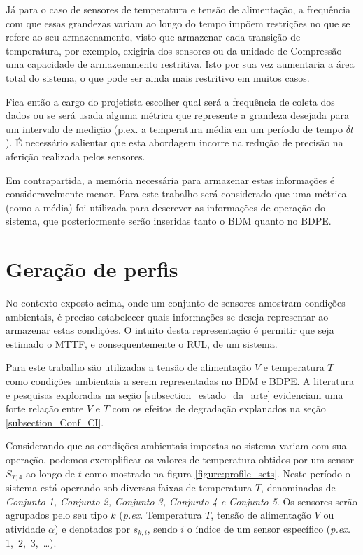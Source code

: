 Já para o caso de sensores de temperatura e tensão de alimentação, a frequência com que essas grandezas variam ao longo do tempo impõem restrições no que se refere ao seu armazenamento, visto que armazenar cada transição de temperatura, por exemplo, exigiria dos sensores ou da unidade de Compressão uma capacidade de armazenamento restritiva. Isto por sua vez aumentaria a área total do sistema, o que pode ser ainda mais restritivo em muitos casos.

Fica então a cargo do projetista escolher qual será a frequência de coleta dos dados ou se será usada alguma métrica que represente a grandeza desejada para um intervalo de medição (p.ex. a temperatura média em um período de tempo $\delta t$). É necessário salientar que esta abordagem incorre na redução de precisão na aferição realizada pelos sensores.

Em contrapartida, a memória necessária para armazenar estas informações é consideravelmente menor. Para este trabalho será considerado que uma métrica (como a média) foi utilizada para descrever as informações de operação do sistema, que posteriormente serão inseridas tanto o BDM quanto no BDPE.
\section{Geração de perfis}
\label{section_obtencao_dados}
No contexto exposto acima, onde um conjunto de sensores amostram condições ambientais, é preciso estabelecer quais informações se deseja representar ao armazenar estas condições. O intuito desta representação é permitir que seja estimado o MTTF, e consequentemente o RUL, de um sistema. 

Para este trabalho são utilizadas a tensão de alimentação $V$ e temperatura $T$ como condições ambientais a serem representadas no BDM e BDPE. A literatura e pesquisas exploradas na seção \ref{subsection_estado_da_arte} evidenciam uma forte relação entre $V$ e $T$ com os efeitos de degradação explanados na seção \ref{subsection_Conf_CI}.

Considerando que as condições ambientais impostas ao sistema variam com sua operação, podemos exemplificar os valores de temperatura obtidos por um sensor $S_{T,4}$ ao longo de $t$ como mostrado na figura \ref{figure:profile_sets}. Neste período o sistema está operando sob diversas faixas de temperatura $T$, denominadas de \textit{Conjunto 1, Conjunto 2, Conjunto 3, Conjunto 4 e Conjunto 5}. Os sensores serão agrupados pelo seu tipo $k$ (\textit{p.ex.} Temperatura $T$, tensão de alimentação $V$ ou atividade $\alpha$) e denotados por $s_{k,i}$, sendo $i$ o índice de um sensor específico (\textit{p.ex.} 1,\ 2,\ 3,\ \dots).


